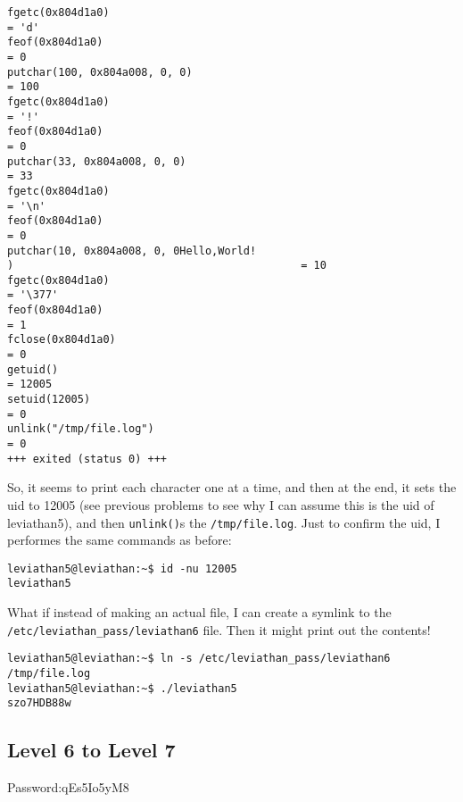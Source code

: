 \documentclass[11pt]{article}
\begin{document}
\begin{lstlisting}
fgetc(0x804d1a0)                                                         = 'd'
feof(0x804d1a0)                                                          = 0
putchar(100, 0x804a008, 0, 0)                                            = 100
fgetc(0x804d1a0)                                                         = '!'
feof(0x804d1a0)                                                          = 0
putchar(33, 0x804a008, 0, 0)                                             = 33
fgetc(0x804d1a0)                                                         = '\n'
feof(0x804d1a0)                                                          = 0
putchar(10, 0x804a008, 0, 0Hello,World!
)                                             = 10
fgetc(0x804d1a0)                                                         = '\377'
feof(0x804d1a0)                                                          = 1
fclose(0x804d1a0)                                                        = 0
getuid()                                                                 = 12005
setuid(12005)                                                            = 0
unlink("/tmp/file.log")                                                  = 0
+++ exited (status 0) +++
\end{lstlisting}

So, it seems to print each character one at a time, and then at the end, it sets the uid to 12005 (see previous problems to see why I can assume this is the uid of leviathan5), and then \verb|unlink()|s the \verb|/tmp/file.log|. Just to confirm the uid, I performes the same commands as before:


\begin{lstlisting}
leviathan5@leviathan:~$ id -nu 12005
leviathan5
\end{lstlisting}

What if instead of making an actual file, I can create a symlink to the \verb|/etc/leviathan_pass/leviathan6| file. Then it might print out the contents!

\begin{lstlisting}
leviathan5@leviathan:~$ ln -s /etc/leviathan_pass/leviathan6 /tmp/file.log
leviathan5@leviathan:~$ ./leviathan5
szo7HDB88w
\end{lstlisting}

\subsection*{Level 6 to Level 7}
Password:qEs5Io5yM8
\end{document}
